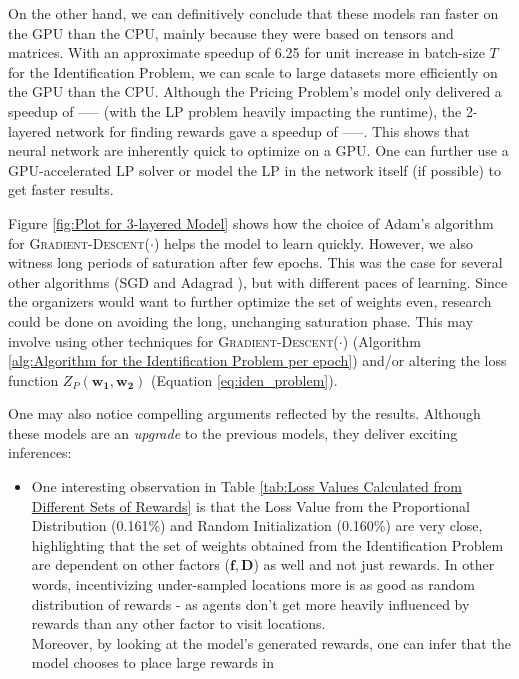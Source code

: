 \documentclass[12pt]{article}
\newcommand{\matr}[1]{\mathbf{#1}}  %
\begin{document}
    On the other hand, we can definitively conclude that these models ran faster on the GPU than the CPU, mainly because they were based on tensors and matrices. With an approximate speedup of 6.25 for unit increase in batch-size $T$ for the Identification Problem, we can scale to large datasets more efficiently on the GPU than the CPU. Although the Pricing Problem's model only delivered a speedup of ----- (with the LP problem heavily impacting the runtime), the 2-layered network for finding rewards gave a speedup of -----. This shows that neural network are inherently quick to optimize on a GPU. One can further use a GPU-accelerated LP solver or model the LP in the network itself (if possible) to get faster results.
    
    Figure \ref{fig:Plot for 3-layered Model} shows how the choice of Adam's algorithm \cite{Adam} for \textsc{Gradient-Descent}($\cdot$) helps the model to learn quickly. However, we also witness long periods of saturation after few epochs. This was the case for several other algorithms (SGD \cite{SGD} and Adagrad \cite{Adagrad}), but with different paces of learning. Since the organizers would want to further optimize the set of weights even, research could be done on avoiding the long, unchanging saturation phase. This may involve using other techniques for \textsc{Gradient-Descent}($\cdot$) (Algorithm \ref{alg:Algorithm for the Identification Problem per epoch}) and/or altering the loss function $Z_P(\matr{w_1}, \matr{w_2})$ (Equation \ref{eq:iden_problem}).
    
    One may also notice compelling arguments reflected by the results. Although these models are an \textit{upgrade} to the previous models, they deliver exciting inferences:
    \begin{itemize}
        \item One interesting observation in Table \ref{tab:Loss Values Calculated from Different Sets of Rewards} is that the Loss Value from the Proportional Distribution (0.161\%) and Random Initialization (0.160\%) are very close, highlighting that the set of weights obtained from the Identification Problem are dependent on other factors ($\matr{f}, \matr{D}$) as well and not just rewards. In other words, incentivizing under-sampled locations more is as good as random distribution of rewards - as agents don't get more heavily influenced by rewards than any other factor to visit locations.\\
        Moreover, by looking at the model's generated rewards, one can infer that the model chooses to place large rewards in 
    \end{itemize}
    
    
    \blindtext
    
    
    
    \cleardoublepage
    
\end{document}
